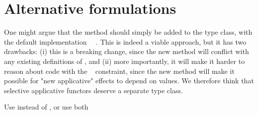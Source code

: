 \section{Alternative formulations}\label{sec-alternatives}

One might argue that the  method should simply be added to the
 type class, with the default implementation
~\hs{=}~. This is indeed a viable approach, but it has
two drawbacks: (i) this is a breaking change, since the new method will conflict
with any existing definitions of , and (ii) more importantly, it will
make it harder to reason about code with the ~ constraint,
since the new method will make it possible for "new applicative" effects to
depend on values. We therefore think that selective applicative functors deserve
a separate type class.

Use  instead of , or use both


